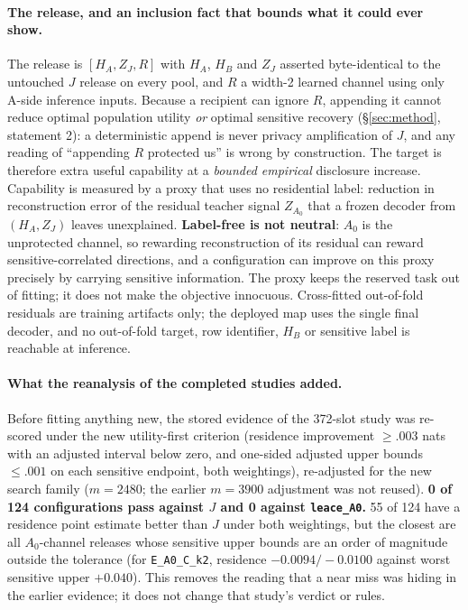 \documentclass[10pt]{article}
\begin{document}
\paragraph{The release, and an inclusion fact that bounds what it could ever show.} The release is
$[H_A,Z_J,R]$ with $H_A$, $H_B$ and $Z_J$ asserted byte-identical to the untouched $J$ release on every pool,
and $R$ a width-2 learned channel using only A-side inference inputs. Because a recipient can ignore $R$,
appending it cannot reduce optimal population utility \emph{or} optimal sensitive recovery
(\S\ref{sec:method}, statement 2): a deterministic append is never privacy amplification of $J$, and any
reading of ``appending $R$ protected us'' is wrong by construction. The target is therefore extra useful
capability at a \emph{bounded empirical} disclosure increase. Capability is measured by a proxy that uses no
residential label: reduction in reconstruction error of the residual teacher signal $Z_{A_0}$ that a frozen
decoder from $(H_A,Z_J)$ leaves unexplained. \textbf{Label-free is not neutral}: $A_0$ is the unprotected
channel, so rewarding reconstruction of its residual can reward sensitive-correlated directions, and a
configuration can improve on this proxy precisely by carrying sensitive information. The proxy keeps the
reserved task out of fitting; it does not make the objective innocuous. Cross-fitted out-of-fold residuals are training artifacts only;
the deployed map uses the single final decoder, and no out-of-fold target, row identifier, $H_B$ or sensitive
label is reachable at inference.


\paragraph{What the reanalysis of the completed studies added.} Before fitting anything new, the stored
evidence of the 372-slot study was re-scored under the new utility-first criterion (residence improvement
$\ge.003$ nats with an adjusted interval below zero, and one-sided adjusted upper bounds $\le.001$ on each
sensitive endpoint, both weightings), re-adjusted for the new search family ($m=2480$; the earlier $m=3900$
adjustment was not reused). \textbf{0 of 124 configurations pass against $J$ and 0 against \texttt{leace\_A0}.}
55 of 124 have a residence point estimate better than $J$ under both weightings, but the closest are all
$A_0$-channel releases whose sensitive upper bounds are an order of magnitude outside the tolerance (for
\texttt{E\_A0\_C\_k2}, residence $-0.0094/-0.0100$ against worst sensitive upper $+0.040$). This removes the
reading that a near miss was hiding in the earlier evidence; it does not change that study's verdict or rules.
\end{document}

